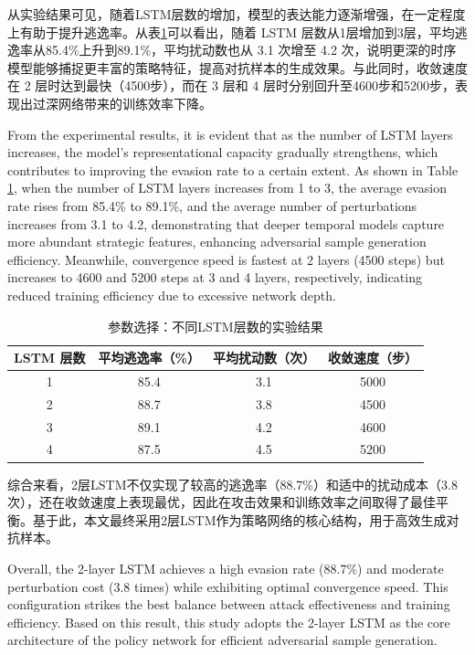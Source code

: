 从实验结果可见，随着LSTM层数的增加，模型的表达能力逐渐增强，在一定程度上有助于提升逃逸率。从表\ref{tab:5.6}可以看出，随着 LSTM 层数从1层增加到3层，平均逃逸率从85.4\%上升到89.1\%，平均扰动数也从 3.1 次增至 4.2 次，说明更深的时序模型能够捕捉更丰富的策略特征，提高对抗样本的生成效果。与此同时，收敛速度在 2 层时达到最快（4500步），而在 3 层和 4 层时分别回升至4600步和5200步，表现出过深网络带来的训练效率下降。

From the experimental results, it is evident that as the number of LSTM layers increases, the model's representational capacity gradually strengthens, which contributes to improving the evasion rate to a certain extent. As shown in Table \ref{tab:5.6}, when the number of LSTM layers increases from 1 to 3, the average evasion rate rises from 85.4\% to 89.1\%, and the average number of perturbations increases from 3.1 to 4.2, demonstrating that deeper temporal models capture more abundant strategic features, enhancing adversarial sample generation efficiency. Meanwhile, convergence speed is fastest at 2 layers (4500 steps) but increases to 4600 and 5200 steps at 3 and 4 layers, respectively, indicating reduced training efficiency due to excessive network depth.

\begin{table}[htbp]
	\centering
	\caption{参数选择：不同LSTM层数的实验结果}
	\label{tab:5.6}
	\begin{tabular*}{0.9\textwidth}{@{\extracolsep{\fill}}cccc}
		\toprule
		LSTM 层数 & 平均逃逸率（\%） & 平均扰动数（次） & 收敛速度（步） \\
		\midrule
		1 & 85.4 & 3.1 & 5000 \\
		2 & 88.7 & 3.8 & 4500 \\
		3 & 89.1 & 4.2 & 4600 \\
		4 & 87.5 & 4.5 & 5200 \\
		\bottomrule
	\end{tabular*}
\end{table}

综合来看，2层LSTM不仅实现了较高的逃逸率（88.7\%）和适中的扰动成本（3.8 次），还在收敛速度上表现最优，因此在攻击效果和训练效率之间取得了最佳平衡。基于此，本文最终采用2层LSTM作为策略网络的核心结构，用于高效生成对抗样本。

Overall, the 2-layer LSTM achieves a high evasion rate (88.7\%) and moderate perturbation cost (3.8 times) while exhibiting optimal convergence speed. This configuration strikes the best balance between attack effectiveness and training efficiency. Based on this result, this study adopts the 2-layer LSTM as the core architecture of the policy network for efficient adversarial sample generation.

